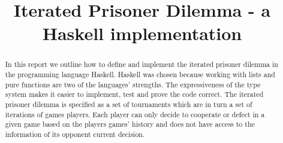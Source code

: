 \documentclass[]{article}
\title{Iterated Prisoner Dilemma - a Haskell implementation}
\author{}
\begin{document}
\maketitle

\begin{abstract}
In this report we outline how to define and implement the iterated prisoner dilemma in the programming language Haskell.
Haskell was chosen because working with lists and pure functions are two of the languages' strengths. The expressiveness of the type system makes it easier to implement, test and prove the code correct.
The iterated prisoner dilemma is specified as a set of tournaments which are in turn a set of iterations of games players.
Each player can only decide to cooperate or defect in a given game based on the players games' history and does not have access to the information of its opponent current decision.
\end{abstract}
\end{document}
